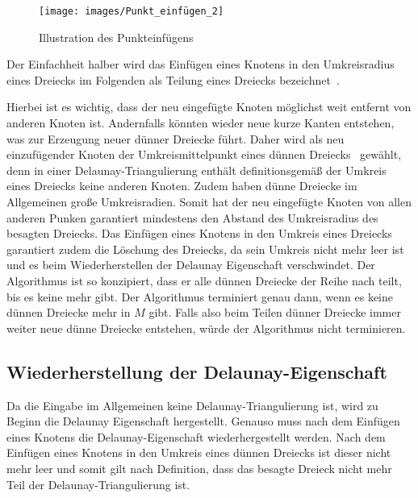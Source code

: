  \begin{figure}[h]
    \centering
    \texttt{[image: images/Punkt\_einfügen\_2]}
    \caption{Illustration des Punkteinfügens~\cite{Sharp:2019:NIT} }%
    \label{fig:Punkt_einfügen}
\end{figure}
 
 
Der Einfachheit halber wird das Einfügen eines Knotens in den Umkreisradius eines Dreiecks im Folgenden als Teilung eines Dreiecks  bezeichnet~\cite[zitiert nach \cite{shewchuk:1997:delaunay}]{Frey:1987:Umkreismittelpunkt}.
 

Hierbei ist es wichtig, dass der neu eingefügte Knoten möglichst weit entfernt von anderen Knoten ist. Andernfalls könnten wieder neue kurze Kanten entstehen, was zur Erzeugung neuer dünner Dreiecke führt. 
Daher wird als neu einzufügender Knoten der Umkreismittelpunkt eines dünnen Dreiecks~\cite{ruppert:1995:delaunay, Frey:1987:Umkreismittelpunkt} gewählt, denn in einer Delaunay-Triangulierung enthält definitionsgemäß der Umkreis eines Dreiecks keine anderen Knoten. Zudem haben dünne Dreiecke im Allgemeinen große Umkreisradien. Somit hat der neu eingefügte Knoten von allen anderen Punken garantiert mindestens den Abstand des Umkreisradius des besagten Dreiecks. Das Einfügen eines Knotens in den Umkreis eines Dreiecks garantiert zudem die Löschung des Dreiecks, da sein Umkreis nicht mehr leer ist und es beim Wiederherstellen der Delaunay Eigenschaft verschwindet. 
Der Algorithmus ist so konzipiert, dass er alle dünnen Dreiecke der Reihe nach teilt, bis es keine mehr gibt. Der Algorithmus terminiert genau dann, wenn es keine dünnen Dreiecke mehr in $M$ gibt. Falls also beim Teilen dünner Dreiecke immer weiter neue dünne Dreiecke entstehen, würde der Algorithmus nicht terminieren.


 

\subsection*{Wiederherstellung der Delaunay-Eigenschaft}
Da die Eingabe im Allgemeinen keine Delaunay-Triangulierung ist, wird zu Beginn die Delaunay Eigenschaft hergestellt.
Genauso muss nach dem Einfügen eines Knotens die Delaunay-Eigenschaft wiederhergestellt werden. Nach dem Einfügen eines Knotens in den Umkreis eines dünnen Dreiecks ist dieser nicht mehr leer und somit gilt nach Definition, dass das besagte Dreieck nicht mehr Teil der Delaunay-Triangulierung ist. \\


